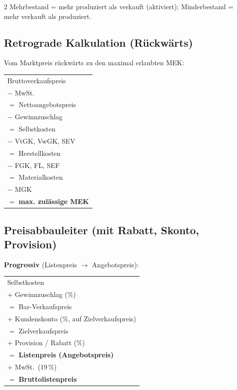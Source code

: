 \documentclass[10pt,a4paper]{article}
\begin{document}
\begin{multicols}{2}
{\footnotesize Mehrbestand = mehr produziert als verkauft (aktiviert); Minderbestand = mehr verkauft als produziert.}

\subsection{Retrograde Kalkulation (Rückwärts)}

Vom Marktpreis rückwärts zu den maximal erlaubten MEK:

\begin{formelbox}
\renewcommand{\arraystretch}{1.1}
\begin{tabular}{@{}l@{}}
Bruttoverkaufspreis \\
$-$ MwSt. \\
$=$ Nettoangebotspreis \\
$-$ Gewinnzuschlag \\
$=$ Selbstkosten \\
$-$ VtGK, VwGK, SEV \\
$=$ Herstellkosten \\
$-$ FGK, FL, SEF \\
$=$ Materialkosten \\
$-$ MGK \\
$=$ \textbf{max. zulässige MEK} \\
\end{tabular}
\end{formelbox}

\subsection{Preisabbauleiter (mit Rabatt, Skonto, Provision)}

\textbf{Progressiv} (Listenpreis $\to$ Angebotspreis):
\begin{formelbox}
\renewcommand{\arraystretch}{1.05}
\begin{tabular}{@{}l@{}}
Selbstkosten \\
$+$ Gewinnzuschlag (\%) \\
\hline
$=$ Bar-Verkaufspreis \\
$+$ Kundenskonto (\%, auf Zielverkaufspreis) \\
\hline
$=$ Zielverkaufspreis \\
$+$ Provision / Rabatt (\%) \\
\hline
$=$ \textbf{Listenpreis (Angebotspreis)} \\
$+$ MwSt.\ (19\,\%) \\
\hline
$=$ \textbf{Bruttolistenpreis} \\
\end{tabular}
\end{formelbox}


\end{multicols}
\end{document}
